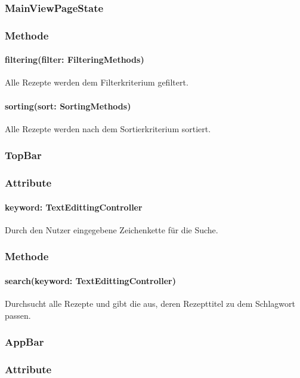 \documentclass[parskip=full]{scrartcl}
\begin{document}
    \subsubsection{MainViewPageState}
        \subsubsection*{Methode}

            \paragraph*{filtering(filter: FilteringMethods)} Alle Rezepte werden dem Filterkriterium gefiltert.
            \paragraph*{sorting(sort: SortingMethods)} Alle Rezepte werden nach dem Sortierkriterium sortiert.

    \subsubsection{TopBar}
        \subsubsection*{Attribute}
            \paragraph*{keyword: TextEdittingController} Durch den Nutzer eingegebene Zeichenkette für die Suche.

        \subsubsection*{Methode}
            \paragraph*{ search(keyword: TextEdittingController)} Durchsucht alle Rezepte und gibt die aus, deren Rezepttitel zu dem Schlagwort passen.


    \subsubsection{AppBar} \label{sec:AppBar}
        \subsubsection*{Attribute}
\end{document}
